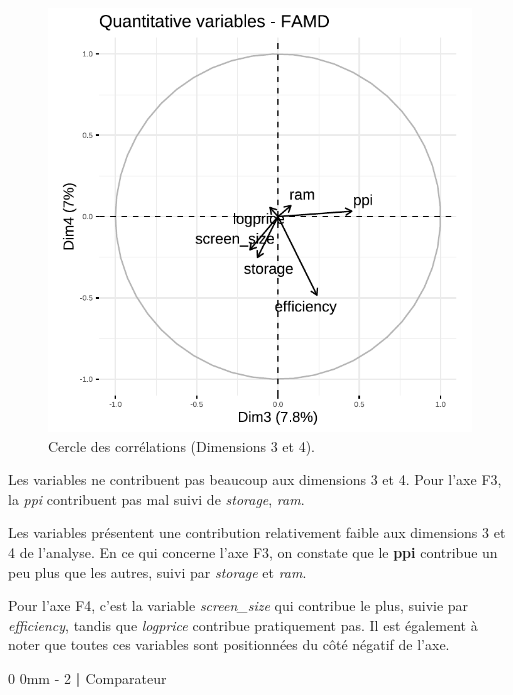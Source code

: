 \documentclass[
  12pt,
]{report}
\makeatletter
\renewcommand{\chapter}{%
    \clearpage %
    \@startsection{chapter}%
    {0} %
    {0mm} %
    {-\baselineskip} %
    {2\baselineskip} %
    {\normalfont\Huge\bfseries | \Huge\bfseries}%
}
\makeatother
\begin{document}
\begin{figure}[H]

{\centering \includegraphics{report_files/figure-pdf/unnamed-chunk-18-1.pdf}

}

\caption{Cercle des corrélations (Dimensions 3 et 4).}

\end{figure}%

Les variables ne contribuent pas beaucoup aux dimensions 3 et 4. Pour
l'axe F3, la \emph{ppi} contribuent pas mal suivi de \emph{storage},
\emph{ram}.

Les variables présentent une contribution relativement faible aux
dimensions 3 et 4 de l'analyse. En ce qui concerne l'axe F3, on constate
que le \textbf{ppi} contribue un peu plus que les autres, suivi par
\emph{storage} et \emph{ram}.

Pour l'axe F4, c'est la variable \emph{screen\_size} qui contribue le
plus, suivie par \emph{efficiency}, tandis que \emph{logprice} contribue
pratiquement pas. Il est également à noter que toutes ces variables sont
positionnées du côté négatif de l'axe.

\chapter{Comparateur}\label{comparateur}
\end{document}
